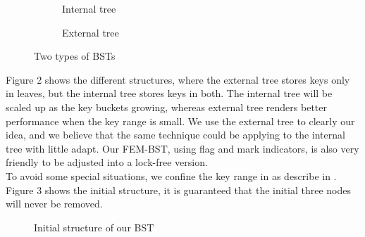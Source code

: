 \documentclass{article}
\begin{document}
\begin{figure}[htbp]
 
\begin{subfigure}{0.5\textwidth}
\centering
{}
\caption{Internal tree}
\label{fig:subim1}
\end{subfigure}
\begin{subfigure}{0.5\textwidth}
\centering
{}
\caption{External tree}
\label{fig:subim2}
\end{subfigure}
 
\caption{Two types of BSTs}
\label{fig:image2}
\end{figure}
Figure 2 shows the different structures, where the external tree stores keys only in leaves, but the internal tree stores keys in both. The internal tree will be scaled up as the key buckets growing, whereas external tree renders better performance when the key range is small\cite{ramachandran2015castle}. We use the external tree to clearly our idea, and we believe that the same technique could be applying to the internal tree with little adapt. Our FEM-BST, using flag and mark indicators, is also very friendly to be adjusted into a lock-free version. \\
To avoid some special situations, we confine the key range  in  as describe in \cite{ellen2010non}. Figure 3 shows the initial structure, it is guaranteed that the initial three nodes will never be removed.
\begin{figure}[htbp]
\centering
{}
\caption{Initial structure of our BST}
\label{fig:my_label5}
\end{figure}
\end{document}
